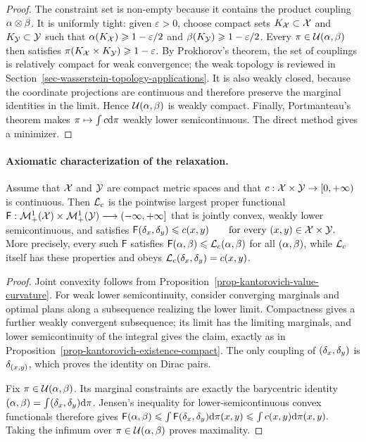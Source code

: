 \begin{proof}
The constraint set is non-empty because it contains the product coupling $\alpha\otimes\beta$. It is uniformly tight: given $\varepsilon>0$, choose compact sets $K_{\mathcal{X}}\subset\mathcal{X}$ and $K_{\mathcal{Y}}\subset\mathcal{Y}$ such that $\alpha(K_{\mathcal{X}})\geqslant1-\varepsilon/2$ and $\beta(K_{\mathcal{Y}})\geqslant1-\varepsilon/2$. Every $\pi\in\mathcal{U}(\alpha,\beta)$ then satisfies
\(\pi(K_{\mathcal{X}}\times K_{\mathcal{Y}})\geqslant1-\varepsilon\).
By Prokhorov's theorem, the set of couplings is relatively compact for weak convergence; the weak topology is reviewed in Section~\ref{sec-wasserstein-topology-applications}. It is also weakly closed, because the coordinate projections are continuous and therefore preserve the marginal identities in the limit. Hence $\mathcal{U}(\alpha,\beta)$ is weakly compact. Finally, Portmanteau's theorem makes $\pi\mapsto\int c\mathrm{d}\pi$ weakly lower semicontinuous. The direct method gives a minimizer.
\end{proof}
\paragraph{Axiomatic characterization of the relaxation.}
\begin{thm}\label{thm-kantorovich-maximal-convex-relaxation}
Assume that $\mathcal{X}$ and $\mathcal{Y}$ are compact metric spaces and that $c:\mathcal{X}\times\mathcal{Y}\to[0,+\infty)$ is continuous. Then $\mathcal{L}_c$ is the pointwise largest proper functional
\(\mathsf F:\mathcal{M}_+^1(\mathcal{X})\times\mathcal{M}_+^1(\mathcal{Y})\longrightarrow(-\infty,+\infty]\)
that is jointly convex, weakly lower semicontinuous, and satisfies \(\mathsf F(\delta_x,\delta_y)\leqslant c(x,y) \qquad\text{for every }(x,y)\in\mathcal{X}\times\mathcal{Y}.\)
More precisely, every such $\mathsf F$ satisfies $\mathsf F(\alpha,\beta)\leqslant\mathcal{L}_c(\alpha,\beta)$ for all $(\alpha,\beta)$,
while $\mathcal{L}_c$ itself has these properties and obeys $\mathcal{L}_c(\delta_x,\delta_y)=c(x,y)$.
\end{thm}
\begin{proof}
Joint convexity follows from Proposition~\ref{prop-kantorovich-value-curvature}. For weak lower semicontinuity, consider converging marginals and optimal plans along a subsequence realizing the lower limit. Compactness gives a further weakly convergent subsequence; its limit has the limiting marginals, and lower semicontinuity of the integral gives the claim, exactly as in Proposition~\ref{prop-kantorovich-existence-compact}. The only coupling of $(\delta_x,\delta_y)$ is $\delta_{(x,y)}$, which proves the identity on Dirac pairs.

Fix $\pi\in\mathcal{U}(\alpha,\beta)$. Its marginal constraints are exactly the barycentric identity $(\alpha,\beta)=\int(\delta_x,\delta_y)\mathrm{d}\pi$.
Jensen's inequality for lower-semicontinuous convex functionals therefore gives \(\mathsf F(\alpha,\beta) \leqslant\int\mathsf F(\delta_x,\delta_y)\mathrm{d}\pi(x,y) \leqslant\int c(x,y)\mathrm{d}\pi(x,y).\)
Taking the infimum over $\pi\in\mathcal{U}(\alpha,\beta)$ proves maximality.
\end{proof}
